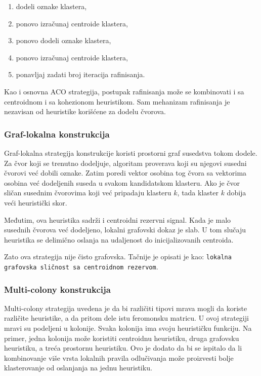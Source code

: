 \documentclass[11pt]{article}
\begin{document}
\begin{enumerate}
    \item dodeli oznake klastera,
    \item ponovo izračunaj centroide klastera,
    \item ponovo dodeli oznake klastera,
    \item ponovo izračunaj centroide klastera,
    \item ponavljaj zadati broj iteracija rafinisanja.
\end{enumerate}

Kao i osnovna ACO strategija, postupak rafinisanja može se kombinovati i sa centroidnom i sa kohezionom heuristikom. Sam mehanizam rafinisanja je nezavisan od heuristike korišćene za dodelu čvorova.

\subsubsection{Graf-lokalna konstrukcija}
Graf-lokalna strategija konstrukcije koristi prostorni graf susedstva tokom dodele. Za čvor koji se trenutno dodeljuje, algoritam proverava koji su njegovi susedni čvorovi već dobili oznake. Zatim poredi vektor osobina tog čvora sa vektorima osobina već dodeljenih suseda u svakom kandidatskom klasteru. Ako je čvor sličan susednim čvorovima koji već pripadaju klasteru $k$, tada klaster $k$ dobija veći heuristički skor.

Međutim, ova heuristika sadrži i centroidni rezervni signal. Kada je malo susednih čvorova već dodeljeno, lokalni grafovski dokaz je slab. U tom slučaju heuristika se delimično oslanja na udaljenost do inicijalizovanih centroida.

Zato ova strategija nije čisto grafovska. Tačnije je opisati je kao: \texttt{lokalna grafovska sličnost sa centroidnom rezervom}.

\subsubsection{Multi-colony konstrukcija}
Multi-colony strategija uvedena je da bi različiti tipovi mrava mogli da koriste različite heuristike, a da pritom dele istu feromonsku matricu. U ovoj strategiji mravi su podeljeni u kolonije. Svaka kolonija ima svoju heurističku funkciju. Na primer, jedna kolonija može koristiti centroidnu heuristiku, druga grafovsku heuristiku, a treća prostornu heuristiku. Ovo je dodato da bi se ispitalo da li kombinovanje više vrsta lokalnih pravila odlučivanja može proizvesti bolje klasterovanje od oslanjanja na jednu heuristiku.
\end{document}
